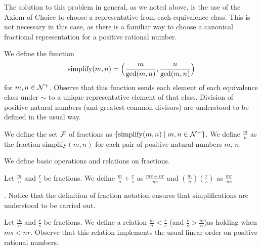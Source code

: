 The solution to this problem in general, as we noted above, is the use
of the Axiom of Choice to choose a representative from
each equivalence class.  This
is not necessary in this case, as there is a familiar way to choose a canonical
fractional representation for a positive rational
number.


\begin{definition}
 We define the function
 $$
  \mathrm{simplify}(m,n) = \Bigl(\frac
      m{\gcd(m,n)},\frac n{\gcd(m,n)}\Bigr)
 $$
 for $m,n \in {\cal N}^+$.  Observe
 that this function sends each element of each equivalence
 class under $\sim$ to a
 unique representative element of that class.  Division of 
 positive natural numbers (and greatest common divisors)
 are understood to be defined in the usual way.
\end{definition}

\begin{definition}
 We define the set ${\cal F}$ of {\upshape fractions} 
 as $\{\mathrm{simplify}(m,n) \mid m, n \in {\cal N}^+\}$.  We define $\frac
 mn$ as the fraction simplify$(m,n)$ for each pair of
 positive natural numbers $m$, $n$.
\end{definition}

We define basic operations and relations on fractions.

\begin{definition}
 Let $\displaystyle\frac mn$ and $\displaystyle\frac rs$ be fractions.  We
 define $\displaystyle\frac mn + \frac rs$ as 
 $\displaystyle\frac{ms +
 nr}{ns}$ and $\displaystyle(\frac mn)(\frac rs)$ as
 $\displaystyle\frac{mr}{ns}$\rule[-3.5mm]{0mm}{8mm}.  Notice that the definition of fraction
 notation ensures that
 simplifications are understood to be carried out.
\end{definition}

\begin{definition}
 Let $\displaystyle\frac mn$ and $\displaystyle\frac rs$ be fractions.  We
 define a relation $\displaystyle\frac mn < \frac rs$ (and $\displaystyle\frac
 rs > \frac mn$)as
 holding when $\displaystyle ms < nr$.  Observe that this relation implements
 the usual linear order on positive
 rational numbers.
\end{definition}

